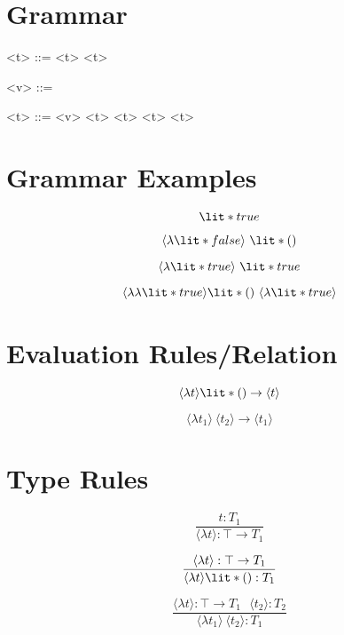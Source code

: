 \documentclass[11hpt]{article}
\begin{document}
\section{Grammar}

\begin{grammar}

<\lambda t> ::= \lit*{() ->} <t>
  \alt \lit*{->} <t>

<v> ::= 
  \alt {}

<t> ::= <v>
  \alt <\lambda t>
  \alt <\lambda t>\lit*{()}
  \alt <\lambda t> <t>
\end{grammar}

\section{Grammar Examples}

\begin{equation}
\lit*{true}
\end{equation}

\begin{equation}
\langle\lambda \lit*{false} \rangle \ \lit*{()}
\end{equation}


\begin{equation}
\langle\lambda \lit*{true} \rangle \ \lit*{true}
\end{equation}

\begin{equation}
\langle\lambda\lambda \lit*{true} \rangle \lit*{()} \ \langle\lambda \lit*{true} \rangle
\end{equation}

\section{Evaluation Rules/Relation}

\begin{equation}
\langle\lambda t\rangle \lit*{()} \to \langle t \rangle
\end{equation}

\begin{equation}
\langle\lambda t_{1}\rangle \ \langle t_{2} \rangle \to \langle t_{1} \rangle
\end{equation}

\section{Type Rules}

\begin{equation}
\frac{t : T_{1}}{\langle \lambda t \rangle: \top \to T_{1}}
\end{equation}

\begin{equation}
\dfrac{\langle\lambda t\rangle : \top \to T_{1}}{\langle\lambda t\rangle \lit*{()}: T_{1}}
\end{equation}

\begin{equation}
\frac{\langle \lambda t \rangle : \top \to T_{1} \ \ \ \langle t_{2} \rangle : T_{2} }{\langle\lambda t_{1}\rangle \ \langle t_{2} \rangle : T_{1}}
\end{equation}
\end{document}
